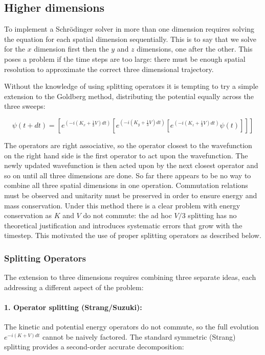 \subsection{Higher dimensions}
To implement a Schr\"odinger solver in more than one dimension requires solving the equation for each spatial dimension sequentially.  This is to say that we solve for the $x$ dimension first then the $y$ and $z$ dimensions, one after the other. This poses a problem if the time steps are too large: there must be enough spatial resolution to approximate the correct three dimensional trajectory.

Without the knowledge of using splitting operators it is tempting to try a simple extension to the Goldberg method, distributing the potential equally across the three sweeps:

\begin{equation}
\psi(t+dt) = [e^{(-i(K_x + \frac{1}{3}V)dt)}  [e^{(-i(K_y + \frac{1}{3}V)dt)}  [e^{(-i(K_z + \frac{1}{3}V)dt)}\psi(t)]]]
\end{equation}

\noindent The operators are right associative, so the operator closest to the wavefunction on the right hand side is the first operator to act upon the wavefunction. The newly updated wavefunction is then acted upon by the next closest operator and so on until all three dimensions are done. So far there appears to be no way to combine all three spatial dimensions in one operation. Commutation relations must be observed and unitarity must be preserved in order to ensure energy and mass conservation. Under this method there is a clear problem with energy conservation as $K$ and $V$ do not commute: the ad hoc $V/3$ splitting has no theoretical justification and introduces systematic errors that grow with the timestep. This motivated the use of proper splitting operators as described below.

\subsubsection{Splitting Operators}
\label{split}
The extension to three dimensions requires combining three separate ideas, each addressing a different aspect of the problem:

\paragraph{1. Operator splitting (Strang/Suzuki):} The kinetic and potential energy operators do not commute, so the full evolution $e^{-i(K+V)dt}$ cannot be naively factored. The standard symmetric (Strang) splitting provides a second-order accurate decomposition:

